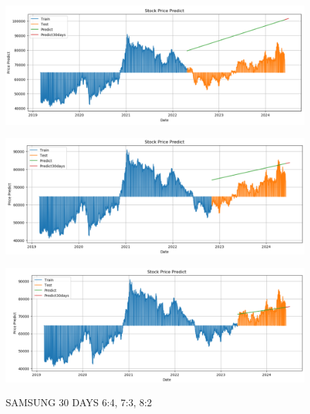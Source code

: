 \documentclass{article}
\begin{document}
\begin{multicols}{2}
\begin{figure}[H]
    \centering
    \begin{minipage}{0.15\textwidth}
    \centering
    \includegraphics[width=1\textwidth]{Image/Linear/Linear_SAMSUNG_6_4_30DAYS.png}
   
    \label{fig:1}
    \end{minipage}%
    \begin{minipage}{0.15\textwidth}
    \centering
    \includegraphics[width=1\textwidth]{Image/Linear/Linear_SAMSUNG_7_3_30DAYS.png}
  
    \label{fig:2}
    \end{minipage}%
    \begin{minipage}{0.15\textwidth}
    \centering
    \includegraphics[width=1\textwidth]{Image/Linear/Linear_SAMSUNG_8_2_30DAYS.png}

    \label{fig:3}
    \end{minipage}
    \caption{SAMSUNG 30 DAYS  6:4, 7:3, 8:2 }
\end{figure}


\end{multicols}
\end{document}

